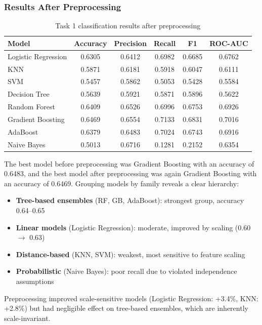 \subsubsection*{Results After Preprocessing}

\begin{table}[H]
\centering
\caption{Task 1 classification results after preprocessing}
\begin{tabular}{lccccc}
\toprule
Model & Accuracy & Precision & Recall & F1 & ROC-AUC \\
\midrule
Logistic Regression & 0.6305 & 0.6412 & 0.6982 & 0.6685 & 0.6762 \\
KNN & 0.5871 & 0.6181 & 0.5918 & 0.6047 & 0.6111 \\
SVM & 0.5457 & 0.5862 & 0.5053 & 0.5428 & 0.5584 \\
Decision Tree & 0.5639 & 0.5921 & 0.5871 & 0.5896 & 0.5622 \\
Random Forest & 0.6409 & 0.6526 & 0.6996 & 0.6753 & 0.6926 \\
Gradient Boosting & 0.6469 & 0.6554 & 0.7133 & 0.6831 & 0.7016 \\
AdaBoost & 0.6379 & 0.6483 & 0.7024 & 0.6743 & 0.6916 \\
Naive Bayes & 0.5013 & 0.6716 & 0.1281 & 0.2152 & 0.6354 \\
\bottomrule
\end{tabular}
\end{table}

The best model before preprocessing was Gradient Boosting with an accuracy of 0.6483, and the
best model after preprocessing was again Gradient Boosting with an accuracy of 0.6469. Grouping models by family reveals a clear hierarchy:
\begin{itemize}[leftmargin=1.5em]
    \item \textbf{Tree-based ensembles} (RF, GB, AdaBoost): strongest group, accuracy 0.64--0.65
    \item \textbf{Linear models} (Logistic Regression): moderate, improved by scaling (0.60 $\to$ 0.63)
    \item \textbf{Distance-based} (KNN, SVM): weakest, most sensitive to feature scaling
    \item \textbf{Probabilistic} (Naive Bayes): poor recall due to violated independence assumptions
\end{itemize}
Preprocessing improved scale-sensitive models (Logistic Regression: +3.4\%, KNN: +2.8\%) but had negligible effect on tree-based ensembles, which are inherently scale-invariant.

